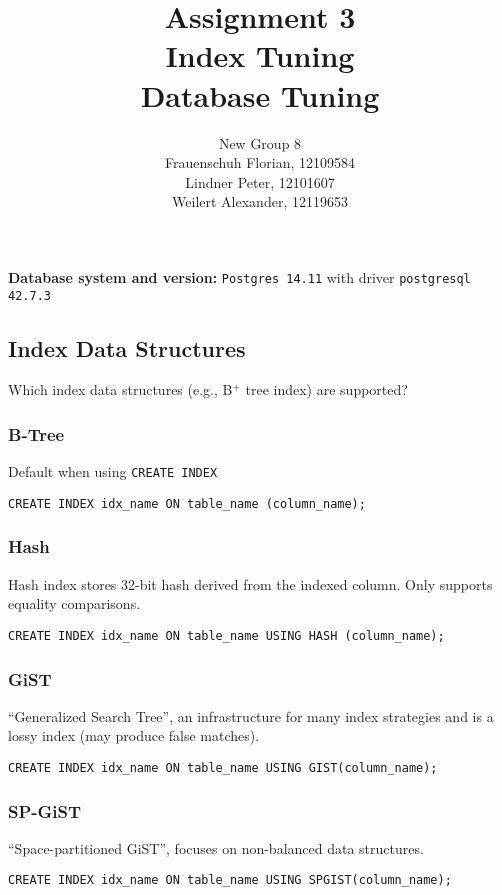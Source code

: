 \documentclass[11pt]{scrartcl}
\title{
  \textbf{\large Assignment 3} \\
  Index Tuning \\
  {\large Database Tuning}}
\author{
  New Group 8 \\
  \large Frauenschuh Florian, 12109584 \\
  \large Lindner Peter, 12101607 \\
  \large Weilert Alexander, 12119653
}
\begin{document}
\maketitle

\textbf{Database system and version:} \texttt{Postgres 14.11} with driver \texttt{postgresql 42.7.3} \\

\subsection{Index Data Structures}

Which index data structures (e.g., B$^+$ tree index) are supported?

\subsubsection*{B-Tree \cite{PostgreSQL2024IndexTypes}}
Default when using \texttt{CREATE INDEX}
\begin{lstlisting}[style=dbtsql]
CREATE INDEX idx_name ON table_name (column_name);
\end{lstlisting}

\subsubsection*{Hash \cite{PostgreSQL2024IndexTypes}}
Hash index stores 32-bit hash derived from the indexed column. Only supports equality comparisons.
\begin{lstlisting}[style=dbtsql]
CREATE INDEX idx_name ON table_name USING HASH (column_name);
\end{lstlisting}

\subsubsection*{GiST \cite{PostgreSQL2024IndexTypes} \cite{PostgreSQL2024GistGin}}
\enquote{Generalized Search Tree}, an infrastructure for many index strategies and is a lossy index (may produce false matches).
\begin{lstlisting}[style=dbtsql]
CREATE INDEX idx_name ON table_name USING GIST(column_name);
\end{lstlisting}

\subsubsection*{SP-GiST \cite{PostgreSQL2024IndexTypes}}
\enquote{Space-partitioned GiST}, focuses on non-balanced data structures.
\begin{lstlisting}[style=dbtsql]
CREATE INDEX idx_name ON table_name USING SPGIST(column_name);
\end{lstlisting}
\end{document}
